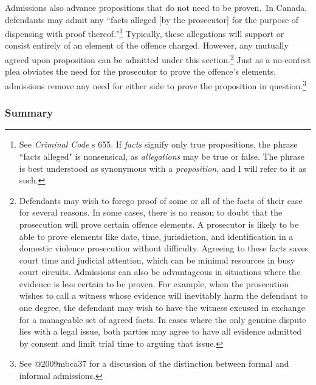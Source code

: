 Admissions also advance propositions that do not need to be proven.\ In Canada, defendants may admit any ``facts alleged [by the prosecutor] for the purpose of dispensing with proof thereof."\footnote{See \textit{Criminal Code} s 655. If \textit{facts} signify only true propositions, the phrase ``facts alleged" is nonsensical, as \textit{allegations} may be true or false. The phrase is best understood as synonymous with a \textit{proposition}, and I will refer to it as such.} Typically, these allegations will support or consist entirely of an element of the offence charged. However, any mutually agreed upon proposition can be admitted under this section.\footnote{Defendants may wish to forego proof of some or all of the facts of their case for several reasons. In some cases, there is no reason to doubt that the prosecution will prove certain offence elements. A prosecutor is likely to be able to prove elements like date, time, jurisdiction, and identification in a domestic violence prosecution without difficulty. Agreeing to these facts saves court time and judicial attention, which can be minimal resources in busy court circuits. Admissions can also be advantageous in situations where the evidence is less certain to be proven. For example, when the prosecution wishes to call a witness whose evidence will inevitably harm the defendant to one degree, the defendant may wish to have the witness excused in exchange for a manageable set of agreed facts. In cases where the only genuine dispute lies with a legal issue, both parties may agree to have all evidence admitted by consent and limit trial time to arguing that issue. } Just as a no-contest plea obviates the need for the prosecutor to prove the offence's elements, admissions remove any need for either side to prove the proposition in question.\footnote{See @2009mbca37 for a discussion of the distinction between formal and informal admissions.}

\subsubsection{Summary}

